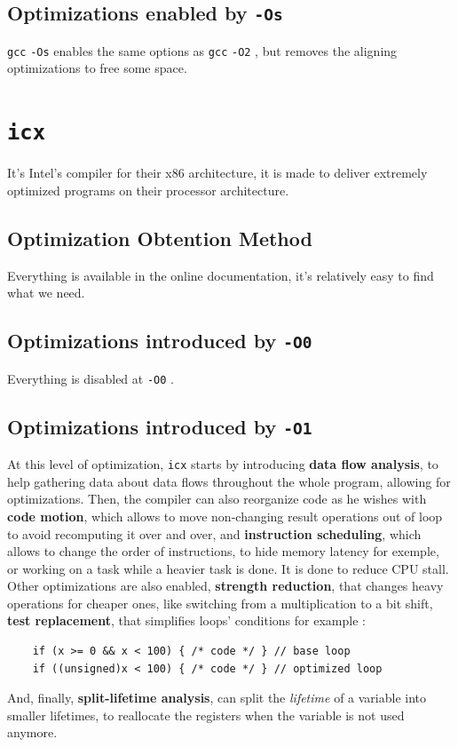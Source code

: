 \documentclass{rapport}
\newcommand{\gcc}{\texttt{gcc} }
\newcommand{\icx}{\texttt{icx} }
\newcommand{\optizero}{\texttt{-O0} }
\newcommand{\optione}{\texttt{-O1} }
\newcommand{\optitwo}{\texttt{-O2} }
\newcommand{\optisize}{\texttt{-Os} }
\begin{document}
\subsection*{Optimizations enabled by \optisize}
\gcc \optisize enables the same options as \gcc \optitwo, but removes the aligning optimizations to free some space.






\section{\icx}
It's Intel's compiler for their x86 architecture, it is made to deliver extremely optimized programs on their processor architecture.
\subsection*{Optimization Obtention Method}
Everything is available in the online documentation, it's relatively easy to find what we need.
\subsection*{Optimizations introduced by \optizero}
Everything is disabled at \optizero.
\subsection*{Optimizations introduced by \optione}
At this level of optimization, \icx starts by introducing \textbf{data flow analysis}, to help gathering data about data flows throughout the whole program, 
allowing for optimizations.\newline
Then, the compiler can also reorganize code as he wishes with \textbf{code motion}, which allows to move non-changing result operations out of loop to avoid 
recomputing it over and over, and \textbf{instruction scheduling}, which allows to change the order of instructions, to hide memory latency for exemple, 
or working on a task while a heavier task is done. It is done to reduce CPU stall.
\newline\newline
Other optimizations are also enabled, \textbf{strength reduction}, that changes heavy operations for cheaper ones, like switching from a multiplication to a bit shift, \textbf{test replacement}, that simplifies loops' conditions for example : 
\begin{verbatim}
    if (x >= 0 && x < 100) { /* code */ } // base loop
    if ((unsigned)x < 100) { /* code */ } // optimized loop
\end{verbatim}
And, finally, \textbf{split-lifetime analysis}, can split the \textit{lifetime} of a variable into smaller lifetimes, to reallocate the registers when the variable is not used anymore.
\end{document}

